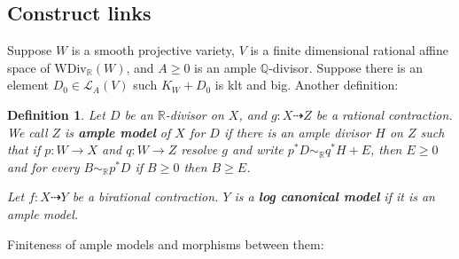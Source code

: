 \documentclass{article}
\newtheorem{defn}{Definition}[section]
\begin{document}
\subsection{Construct links}
Suppose $ W $ is a smooth projective variety, $ V $ is a finite dimensional rational affine space of $ \mathrm{WDiv}_\mathbb{R}(W) $, and $ A\geqslant 0 $ is an ample $ \mathbb{Q} $-divisor. Suppose there is an element $ D_0\in \mathcal{L}_A(V) $ such $ K_W+D_0 $ is klt and big.
Another definition:
\begin{defn}
Let $ D $ be an $ \mathbb{R} $-divisor on $ X $, and $ g:X\dashrightarrow Z $ be a rational contraction. We call $ Z $ is \textbf{ample model} of $ X $ for $ D $ if there is an ample divisor $ H $ on $ Z $ such that if $ p:W\to X $ and $ q:W\to Z $ resolve $ g $ and write $ p^*D\sim_\mathbb{R}q^*H+E $, then $ E\geqslant 0 $ and for every $ B\sim_\mathbb{R}p^*D $ if $ B\geqslant 0 $ then $ B\geqslant E $.

Let $ f:X\dashrightarrow Y $ be a birational contraction. $ Y $ is a \textbf{log canonical model} if it is an ample model.
\end{defn}
Finiteness of ample models and morphisms between them:
\end{document}
